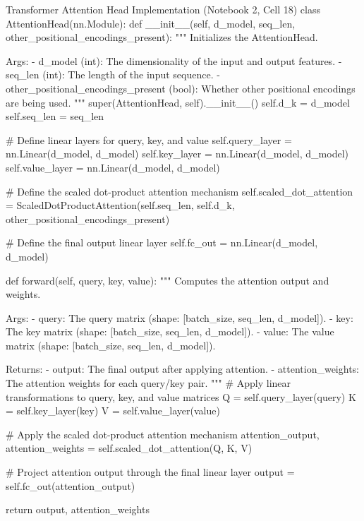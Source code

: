 \documentclass[11pt,a4paper]{article}
\begin{document}
\begin{solutioncode}[label=lst:attention_head]{Transformer Attention Head Implementation (Notebook 2, Cell 18)}
class AttentionHead(nn.Module):
    def __init__(self, d_model, seq_len, other_positional_encodings_present):
        """
        Initializes the AttentionHead.

        Args:
        - d_model (int): The dimensionality of the input and output features.
        - seq_len (int): The length of the input sequence.
        - other_positional_encodings_present (bool): Whether other positional encodings are being used.
        """
        super(AttentionHead, self).__init__()
        self.d_k = d_model
        self.seq_len = seq_len

        # Define linear layers for query, key, and value
        self.query_layer = nn.Linear(d_model, d_model)
        self.key_layer = nn.Linear(d_model, d_model)
        self.value_layer = nn.Linear(d_model, d_model)

        # Define the scaled dot-product attention mechanism
        self.scaled_dot_attention = ScaledDotProductAttention(self.seq_len, self.d_k, other_positional_encodings_present)

        # Define the final output linear layer
        self.fc_out = nn.Linear(d_model, d_model)

    def forward(self, query, key, value):
        """
        Computes the attention output and weights.

        Args:
        - query: The query matrix (shape: [batch_size, seq_len, d_model]).
        - key: The key matrix (shape: [batch_size, seq_len, d_model]).
        - value: The value matrix (shape: [batch_size, seq_len, d_model]).
        
        Returns:
        - output: The final output after applying attention.
        - attention_weights: The attention weights for each query/key pair.
        """
        # Apply linear transformations to query, key, and value matrices
        Q = self.query_layer(query)
        K = self.key_layer(key)
        V = self.value_layer(value)

        # Apply the scaled dot-product attention mechanism
        attention_output, attention_weights = self.scaled_dot_attention(Q, K, V)

        # Project attention output through the final linear layer
        output = self.fc_out(attention_output)

        return output, attention_weights
\end{solutioncode}
\end{document}
